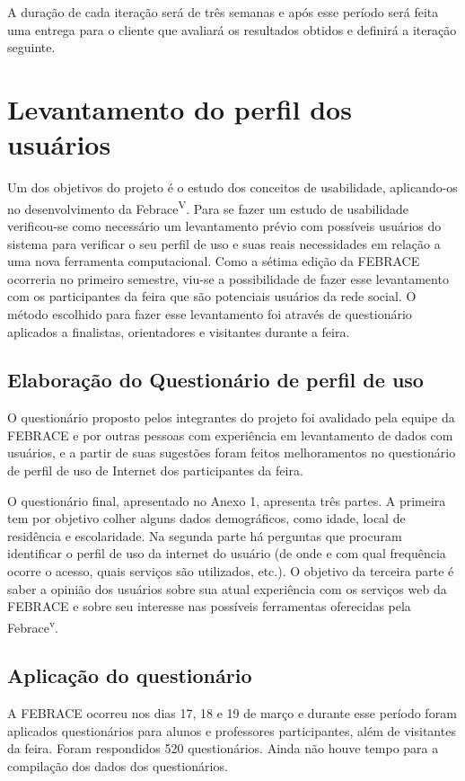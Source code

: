 \documentclass[a4paper,12pt,font=plain,header=plain]{abnt}
\begin{document}
	A duração de cada iteração será de três semanas e após esse período será feita uma entrega para o cliente que avaliará os resultados obtidos e definirá a iteração seguinte.

  \chapter{Levantamento do perfil dos usuários}
    Um dos objetivos do projeto é o estudo dos conceitos de usabilidade, aplicando-os no desenvolvimento da Febrace\textsuperscript{V}. Para se fazer um estudo de usabilidade verificou-se como necessário um levantamento prévio com possíveis usuários do sistema para verificar o seu perfil de uso e suas reais necessidades em relação a uma nova ferramenta computacional. Como a sétima edição da FEBRACE ocorreria no primeiro semestre, viu-se a possibilidade de fazer esse levantamento com os participantes da feira que são potenciais usuários da rede social. O método escolhido para fazer esse levantamento foi através de questionário aplicados a finalistas, orientadores e visitantes durante a feira.

    \section{Elaboração do Questionário de perfil de uso}
      O questionário proposto pelos integrantes do projeto foi avalidado pela equipe da FEBRACE e por outras pessoas com experiência em levantamento de dados com usuários, e a partir de suas sugestões foram feitos melhoramentos no questionário de perfil de uso de Internet dos participantes da feira.

      O questionário final, apresentado no Anexo 1, apresenta três partes. A primeira tem por objetivo colher alguns dados demográficos, como idade, local de residência e escolaridade. Na segunda parte há perguntas que procuram identificar o perfil de uso da internet do usuário (de onde e com qual frequência ocorre o acesso, quais serviços são utilizados, etc.). O objetivo da terceira parte é saber a opinião dos usuários sobre sua atual experiência com os serviços web da FEBRACE e sobre seu interesse nas possíveis ferramentas oferecidas pela Febrace\textsuperscript{v}.

    \section{Aplicação do questionário}
      A FEBRACE ocorreu nos dias 17, 18 e 19 de março e durante esse período foram aplicados questionários para alunos e professores participantes, além de visitantes da feira. Foram respondidos 520 questionários. Ainda não houve tempo para a compilação dos dados dos questionários.
\end{document}
